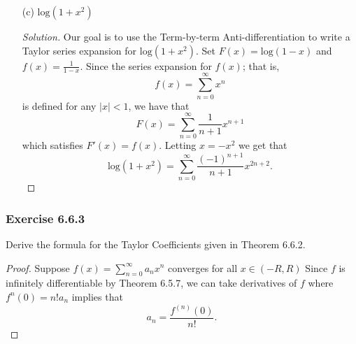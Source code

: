 \begin{enumerate}
\begin{proof}[Solution]
        Letting \( x = -4x^2  \) and multiplying by \( x  \), we arrive at the following Taylor series expansion 
        \[  \frac{ x  }{ (1 + 4x^2 )^2  } = \sum_{ n=1  }^{ \infty  } (-4)^{n-1} n  x^{2n - 1 }  \]
        which holds for all \( x \in (-R ,R ) \).
        \end{proof}
    \item[(c)] \( \text{log}(1+x^2) \)
        \begin{proof}[Solution]
            Our goal is to use the Term-by-term Anti-differentiation to write a Taylor series expansion for  \(  \text{log}(1+x^2) \). Set \( F(x) = \text{log}(1-x) \) and \( f(x) = \frac{ 1 }{ 1 - x  }  \). Since the series expansion for \( f(x)  \); that is, 
            \[  f(x) =\sum_{ n = 0  }^{ \infty  } x^n \] is defined for any \( | x  | < 1  \), we have that 
            \[  F(x) = \sum_{ n=0 }^{ \infty  } \frac{ 1 }{ n+1  } x^{n+1} \]
            which satisfies  \( F'(x) = f(x)  \). Letting \( x = - x^2  \) we get that 
            \[  \text{log}(1 + x^2 ) =  \sum_{ n=0  }^{ \infty  } \frac{ (-1)^{n+1}  }{ n+1  } x^{2n+2}.\]
        \end{proof}
\end{enumerate}






\subsubsection{Exercise 6.6.3} Derive the formula for the Taylor Coefficients given in Theorem 6.6.2.
\begin{proof}
    Suppose \( f(x) = \sum_{ n=0 }^{ \infty  } a_n x^n  \) converges for all \( x \in (-R ,R ) \) Since \( f  \) is infinitely differentiable by Theorem 6.5.7, we can take derivatives of \( f  \) where \( f^{n}(0)= n! a_n    \) implies that 
    \[  a_n = \frac{ f^{(n)}(0) }{ n! }. \]
    \[   \]
\end{proof}

